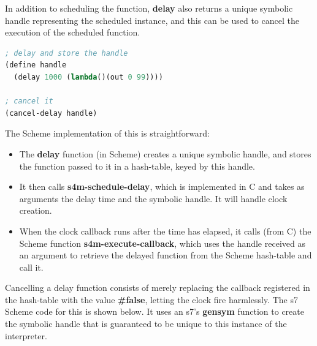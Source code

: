 \documentclass[acmsmall]{acmart}
\begin{document}
In addition to scheduling the function, \textbf{delay} also returns a unique
symbolic handle representing the scheduled instance, and this can be used to 
cancel the execution of the scheduled function.

\begin{lstlisting}[language=lisp]
; delay and store the handle
(define handle 
  (delay 1000 (lambda()(out 0 99))))

; cancel it
(cancel-delay handle)
\end{lstlisting}

The Scheme implementation of this is straightforward:

\begin{itemize}
\item The \textbf{delay} function (in Scheme) creates a unique symbolic handle, and stores the 
  function passed to it in a hash-table, keyed by this handle.
\item It then calls \textbf{s4m-schedule-delay}, which is implemented
  in C and takes as arguments the delay time and the symbolic handle. It will handle 
  clock creation.
\item When the clock callback runs after the time has elapsed, it calls (from C) the Scheme function 
  \textbf{s4m-execute-callback}, which uses the handle received as an argument 
  to retrieve the delayed function from the Scheme hash-table and call it.
\end{itemize}

Cancelling a delay function consists of merely replacing the callback registered
in the hash-table with the value \textbf{\#false}, letting the clock fire harmlessly.
The s7 Scheme code for this is shown below. It uses an s7's \textbf{gensym} function to create the
symbolic handle that is guaranteed to be unique to this instance of the interpreter.
\end{document}
